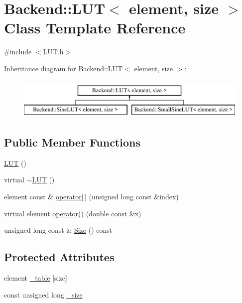\hypertarget{class_backend_1_1_l_u_t}{\section{Backend\+:\+:L\+U\+T$<$ element, size $>$ Class Template Reference}
\label{class_backend_1_1_l_u_t}
}


{\ttfamily \#include $<$L\+U\+T.\+h$>$}

Inheritance diagram for Backend\+:\+:L\+U\+T$<$ element, size $>$\+:\begin{figure}[H]
\begin{center}
\leavevmode
\includegraphics[height=2.000000cm]{class_backend_1_1_l_u_t}
\end{center}
\end{figure}
\subsection*{Public Member Functions}
\begin{DoxyCompactItemize}
\item 
\hyperlink{class_backend_1_1_l_u_t_a8541a1794b0eef2e15eadcfab8cdb12f}{L\+U\+T} ()
\item 
virtual \hyperlink{class_backend_1_1_l_u_t_a1c4d93f58ba28397417f71f436740034}{$\sim$\+L\+U\+T} ()
\item 
element const \& \hyperlink{class_backend_1_1_l_u_t_a9a7c75f36c72778098a091db3269c29c}{operator\mbox{[}$\,$\mbox{]}} (unsigned long const \&index)
\item 
virtual element \hyperlink{class_backend_1_1_l_u_t_aea3420a7a3552f38ba8f9ea979bab764}{operator()} (double const \&x)
\item 
unsigned long const \& \hyperlink{class_backend_1_1_l_u_t_a3ab84f04569e89cd6046da599c6edbae}{Size} () const 
\end{DoxyCompactItemize}
\subsection*{Protected Attributes}
\begin{DoxyCompactItemize}
\item 
element \hyperlink{class_backend_1_1_l_u_t_ae70f3f0c9aaa9e0b85517d8e2c61d9a5}{\+\_\+table} \mbox{[}size\mbox{]}
\item 
const unsigned long \hyperlink{class_backend_1_1_l_u_t_a94d2ce1a7c644ce2d4f8e905790b9b54}{\+\_\+size}
\end{DoxyCompactItemize}


